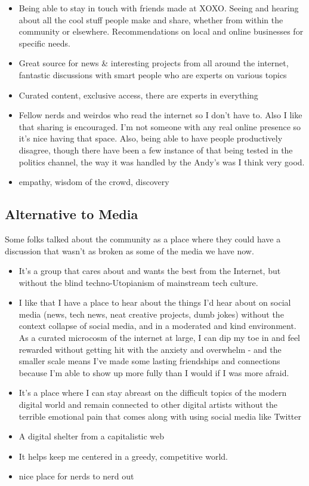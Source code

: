 \documentclass[
]{book}
\providecommand{\tightlist}{%
  \setlength{\itemsep}{0pt}\setlength{\parskip}{0pt}}
\begin{document}
\begin{itemize}
\tightlist
\item
  Being able to stay in touch with friends made at XOXO. Seeing and hearing about all the cool stuff people make and share, whether from within the community or elsewhere. Recommendations on local and online businesses for specific needs.
\item
  Great source for news \& interesting projects from all around the internet, fantastic discussions with smart people who are experts on various topics
\item
  Curated content, exclusive access, there are experts in everything
\item
  Fellow nerds and weirdos who read the internet so I don't have to. Also I like that sharing is encouraged. I'm not someone with any real online presence so it's nice having that space. Also, being able to have people productively disagree, though there have been a few instance of that being tested in the politics channel, the way it was handled by the Andy's was I think very good.
\item
  empathy, wisdom of the crowd, discovery
\end{itemize}

\subsection{Alternative to Media}\label{alternative-to-media}

Some folks talked about the community as a place where they could have a discussion that wasn't as broken as some of the media we have now.

\begin{itemize}
\tightlist
\item
  It's a group that cares about and wants the best from the Internet, but without the blind techno-Utopianism of mainstream tech culture.
\item
  I like that I have a place to hear about the things I'd hear about on social media (news, tech news, neat creative projects, dumb jokes) without the context collapse of social media, and in a moderated and kind environment. As a curated microcosm of the internet at large, I can dip my toe in and feel rewarded without getting hit with the anxiety and overwhelm - and the smaller scale means I've made some lasting friendships and connections because I'm able to show up more fully than I would if I was more afraid.
\item
  It's a place where I can stay abreast on the difficult topics of the modern digital world and remain connected to other digital artists without the terrible emotional pain that comes along with using social media like Twitter
\item
  A digital shelter from a capitalistic web
\item
  It helps keep me centered in a greedy, competitive world.
\item
  nice place for nerds to nerd out
\end{itemize}
\end{document}
